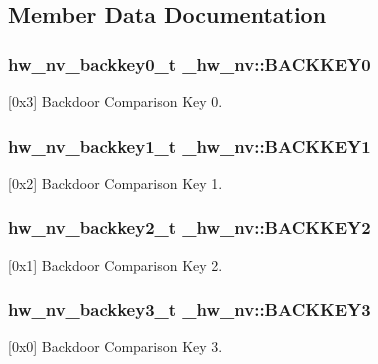 \subsection{Member Data Documentation}
\subsubsection[{\texorpdfstring{B\+A\+C\+K\+K\+E\+Y0}{BACKKEY0}}]{ {\bf hw\+\_\+nv\+\_\+backkey0\+\_\+t} \+\_\+hw\+\_\+nv\+::\+B\+A\+C\+K\+K\+E\+Y0}\hypertarget{struct__hw__nv_a608a858644a27d985c8b359c6e071570}{}\label{struct__hw__nv_a608a858644a27d985c8b359c6e071570}
\mbox{[}0x3\mbox{]} Backdoor Comparison Key 0. 
\subsubsection[{\texorpdfstring{B\+A\+C\+K\+K\+E\+Y1}{BACKKEY1}}]{ {\bf hw\+\_\+nv\+\_\+backkey1\+\_\+t} \+\_\+hw\+\_\+nv\+::\+B\+A\+C\+K\+K\+E\+Y1}\hypertarget{struct__hw__nv_ad38a039bc252916c43f9ece1cfe81268}{}\label{struct__hw__nv_ad38a039bc252916c43f9ece1cfe81268}
\mbox{[}0x2\mbox{]} Backdoor Comparison Key 1. 
\subsubsection[{\texorpdfstring{B\+A\+C\+K\+K\+E\+Y2}{BACKKEY2}}]{ {\bf hw\+\_\+nv\+\_\+backkey2\+\_\+t} \+\_\+hw\+\_\+nv\+::\+B\+A\+C\+K\+K\+E\+Y2}\hypertarget{struct__hw__nv_ac85ed471ef9459a77e5c4de7cdbbd94e}{}\label{struct__hw__nv_ac85ed471ef9459a77e5c4de7cdbbd94e}
\mbox{[}0x1\mbox{]} Backdoor Comparison Key 2. 
\subsubsection[{\texorpdfstring{B\+A\+C\+K\+K\+E\+Y3}{BACKKEY3}}]{ {\bf hw\+\_\+nv\+\_\+backkey3\+\_\+t} \+\_\+hw\+\_\+nv\+::\+B\+A\+C\+K\+K\+E\+Y3}\hypertarget{struct__hw__nv_a15f70600cc22e7c8994dfa842578fed9}{}\label{struct__hw__nv_a15f70600cc22e7c8994dfa842578fed9}
\mbox{[}0x0\mbox{]} Backdoor Comparison Key 3. 
